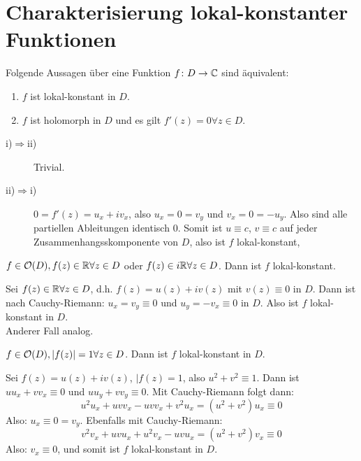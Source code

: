 \section*{Charakterisierung lokal-konstanter Funktionen}
\begin{proposition}
	Folgende Aussagen \"uber eine Funktion $ f\colon D\rightarrow\mathbb{C} $ sind \"aquivalent:
	\begin{enumerate}
		\item $ f $ ist lokal-konstant in $ D $.
		\item $ f $ ist holomorph in $ D $ und es gilt $ f'(z)=0\forall z\in D $.
	\end{enumerate}
\end{proposition}
\begin{beweis}
	\begin{description}
		\item[i)$ \Rightarrow $ii)] Trivial.
		\item[ii)$ \Rightarrow $i)] $ 0=f'(z)=u_x+iv_x $, also $ u_x=0=v_y $ und $ v_x=0=-u_y $. Also sind alle partiellen Ableitungen identisch $ 0 $. Somit ist $ u\equiv c $, $ v\equiv c $ auf jeder Zusammenhangsskomponente von $ D $, also ist $ f $ lokal-konstant,
	\end{description}
\end{beweis}
\begin{korollar}
	$ f\in\mathcal O(D), f(z)\in\mathbb{R}\forall z\in D  $ oder $ f(z)\in i\mathbb{R}\forall z\in D $. Dann ist $ f $ lokal-konstant.
\end{korollar}
\begin{beweis}
	Sei $ f(z)\in\mathbb{R}\forall z\in D $, d.h. $ f(z)=u(z)+iv(z) $ mit $ v(z)\equiv 0 $ in $ D $. Dann ist nach Cauchy-Riemann: $ u_x=v_y\equiv 0 $ und $ u_y=-v_x\equiv 0 $ in $ D $. Also ist $ f $ lokal-konstant in $ D $.\\
	Anderer Fall analog.
\end{beweis}
\begin{korollar}
	$ f\in\mathcal O(D), |f(z)|=1\forall z\in D $. Dann ist $ f $ lokal-konstant in $ D $.
\end{korollar}
\begin{beweis}
	Sei $ f(z)=u(z)+iv(z) $, $ |f(z)=1 $, also $ u^2+v^2\equiv 1 $. Dann ist $ uu_x+vv_x\equiv 0 $ und $ uu_y+vv_y\equiv 0 $. Mit Cauchy-Riemann folgt dann:
	\[ u^2u_x+uvv_x-uvv_x+v^2u_x=(u^2+v^2)u_x\equiv 0 \]
	Also: $ u_x\equiv 0=v_y $. Ebenfalls mit Cauchy-Riemann:
	\[ v^2v_x+uvu_x+u^2v_x-uvu_x=(u^2+v^2)v_x\equiv 0 \]
	Also: $ v_x\equiv 0 $, und somit ist $ f $ lokal-konstant in $ D $.
\end{beweis}
